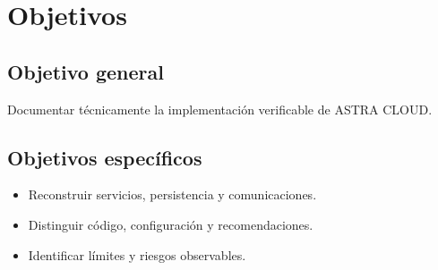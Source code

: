 \chapter{Objetivos}\section{Objetivo general}Documentar técnicamente la implementación verificable de ASTRA CLOUD.\section{Objetivos específicos}\begin{itemize}\item Reconstruir servicios, persistencia y comunicaciones.\item Distinguir código, configuración y recomendaciones.\item Identificar límites y riesgos observables.\end{itemize}
